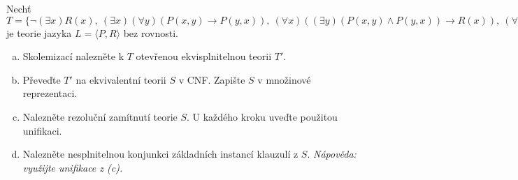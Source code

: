\begin{problem}

    Nechť $T=\{\neg(\exists x) R(x),\ (\exists x)(\forall y)(P(x,y)\to P(y,x)),\ (\forall x)((\exists y)(P(x,y)\wedge P(y,x))\to R(x)),\ (\forall x)(\exists y)P(x,y)\}$ je teorie jazyka $L=\langle P,R\rangle$ bez rovnosti.

    \begin{enumerate}[(a)]
        \item Skolemizací nalezněte k $T$ otevřenou ekvisplnitelnou teorii $T'$.
        \item Převeďte $T'$ na ekvivalentní teorii $S$ v CNF. Zapište $S$ v množinové reprezentaci.
        \item Nalezněte rezoluční zamítnutí teorie $S$. U každého kroku uveďte použitou unifikaci.
        \item Nalezněte nesplnitelnou konjunkci základních instancí klauzulí z $S$. {\it Nápověda: využijte unifikace z (c).}       
    \end{enumerate}

    \begin{solution}
        

\end{solution}
\end{problem}
